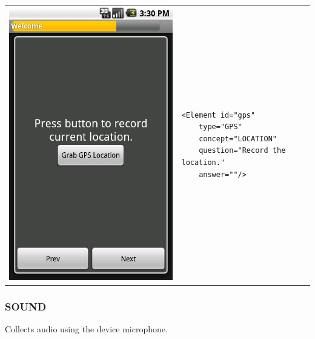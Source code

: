\documentclass[a4paper,10pt]{article}
\begin{document}
\noindent\begin{tabular}{ p{3.5cm}  p{7.5cm} }
\includegraphics[scale=0.2,keepaspectratio=true]{client_gps.png}
& \begin{verbatim}
<Element id="gps"
    type="GPS"  
    concept="LOCATION"  
    question="Record the location."  
    answer=""/>\end{verbatim}
\end{tabular}

\subsubsection{SOUND} Collects audio using the device microphone.
\end{document}
